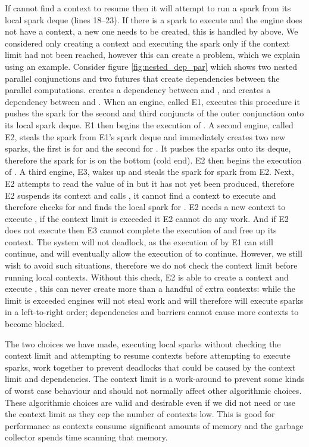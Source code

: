 If \idle cannot find a context to resume then it
will attempt to run a spark from its local spark deque (lines 18--23).
If there is a spark to execute and the engine does not have a context,
a new one needs to be created,
this is handled by \prepareengineforspark above.
We considered only creating a context and executing the spark only if the
context limit had not been reached,
however this can create a problem, which we explain using an example.
Consider figure \ref{fig:nested_dep_par} which shows two nested
parallel conjunctions
and
two futures that create dependencies between the parallel
computations.
 creates a dependency between  and ,
and  creates a dependency between  and .
When an engine, called E1,
executes this procedure it pushes the spark for the second and third
conjuncts of the outer conjunction onto its local spark deque.
E1 then begins the execution of .
A second engine, called E2,
steals the spark from E1's spark deque and immediately creates two new
sparks, the first is for  and the second for .
It pushes the sparks onto its deque,
therefore the spark for  is on the bottom (cold end).
E2 then begins the execution of .
A third engine, E3,
wakes up and steals the spark for  spark from E2.
Next,
E2 attempts to read the value of  in  but it has not yet
been produced,
therefore E2 suspends its context and calls \idle, it cannot find a context
to execute and therefore checks for and finds the local spark for .
E2 needs a new context to execute , if the context limit is exceeded
it E2 cannot do any work.
And if E2 does not execute  then E3 cannot complete the execution of
 and free up its context.
The system will not deadlock, as the execution of  by E1 can still
continue, and will eventually allow the execution of  to continue.
However, we still wish to avoid such situations,
therefore we do not check the context limit before running local contexts.
Without this check,
E2 is able to create a context and execute ,
this can never create more than a handful of extra contexts:
while the limit is exceeded engines will not steal work and will therefore
will execute sparks in a left-to-right order;
dependencies and barriers cannot cause more contexts to become blocked.

The two choices we have made,
executing local sparks without checking the context limit and
attempting to resume contexts before attempting to execute sparks,
work together to prevent deadlocks that could be caused by
the context limit and dependencies.
The context limit is a work-around to prevent some kinds of worst case
behaviour and should not normally affect other algorithmic choices.
These algorithmic choices are valid and desirable even if we did not need or
use the context limit as they eep the number of contexts low.
This is good for performance as contexts consume significant amounts of
memory and the garbage collector spends time scanning that memory.

